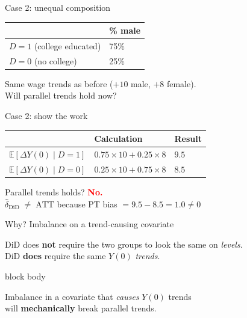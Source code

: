 \documentclass[aspectratio=169,11pt]{beamer}
\newcommand{\emphbox}[1]{%
  \begin{beamercolorbox}[rounded=true,sep=7pt,wd=\linewidth]{block body}%
    \small\color{slate}\raggedright #1%
  \end{beamercolorbox}}
\begin{document}
\begin{frame}{Case 2: unequal composition}
\vspace{0.5em}
\begin{center}
\begin{tabular}{@{}ll@{}}
\toprule
& \textbf{\% male} \\
\midrule
$D{=}1$ (college educated) & 75\% \\
$D{=}0$ (no college)       & 25\% \\
\bottomrule
\end{tabular}
\end{center}
\vspace{0.8em}
\begin{center}
\color{warmgray}\small
Same wage trends as before ($+10$ male, $+8$ female).\\
Will parallel trends hold now?
\end{center}
\end{frame}

\begin{frame}{Case 2: show the work}
\vspace{0.6em}
\begin{center}
\begin{tabular}{@{}lll@{}}
\toprule
& \textbf{Calculation} & \textbf{Result} \\
\midrule
$\mathbb{E}[\Delta Y(0)\mid D{=}1]$ & $0.75\times10 + 0.25\times8$ & $9.5$ \\[0.3em]
$\mathbb{E}[\Delta Y(0)\mid D{=}0]$ & $0.25\times10 + 0.75\times8$ & $8.5$ \\
\bottomrule
\end{tabular}
\end{center}
\vspace{0.8em}
\begin{center}
Parallel trends holds? \quad \textcolor{red}{\textbf{No.}}\\[0.3em]
\color{warmgray}\small
$\widehat{\delta}_{\text{DiD}} \;\neq\; \text{ATT}$
\quad because PT bias $= 9.5 - 8.5 = 1.0 \neq 0$
\end{center}
\end{frame}

\begin{frame}{Why? Imbalance on a trend-causing covariate}
\vspace{0.8em}
\begin{center}
DiD does \textbf{not} require the two groups to look the same on \emph{levels}.\\[0.6em]
DiD \textbf{does} require the same $Y(0)$ \emph{trends}.\\[0.8em]
\end{center}
\emphbox{Imbalance in a covariate that \emph{causes} $Y(0)$ trends\\
will \textbf{mechanically} break parallel trends.}
\end{frame}
\end{document}
